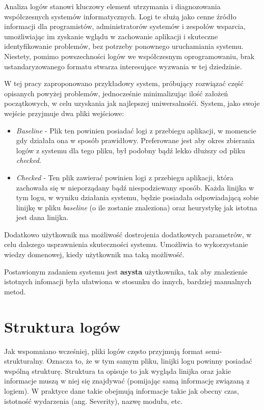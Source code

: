 Analiza logów stanowi kluczowy element utrzymania i diagnozowania współczesnych
systemów informatycznych. Logi te służą jako cenne źródło informacji dla
programistów, administratorów systemów i zespołów wsparcia, umożliwiając im
zyskanie wglądu w zachowanie aplikacji i skuteczne identyfikowanie problemów,
bez potrzeby ponownego uruchamiania systemu.
Niestety, pomimo powszechności logów we współczesnym oprogramowaniu, brak
ustandaryzowanego formatu stwarza interesujące wyzwania w tej dziedzinie.

W tej pracy zaproponowano przykładowy system, próbujący rozwiązać część
opisanych powyżej problemów, jednocześnie minimalizując ilość założeń
początkowych, w celu uzyskania jak najlepszej uniwersalnośći.
System, jako swoje wejście przyjmuje dwa pliki wejściowe:

\begin{itemize}
  \item \textit{Baseline} - Plik ten powinien posiadać logi z przebiegu aplikacji, w
    momencie gdy działała ona w sposób prawidłowy.
    Preferowane jest aby okres zbierania logów z systemu dla tego pliku, był
    podobny bądź lekko dłuższy od pliku \textit{checked}.
  \item \textit{Checked} - Ten plik zawierać powinien logi z przebiegu
    aplikacji, która zachowała się w nieporządany bądź niespodziewany sposób.
    Każda linijka w tym logu, w wyniku działania systemu, będzie posiadała
    odpowiadającą sobie linijkę w pliku \textit{baseline} (o ile zostanie
    znaleziona) oraz heurystykę jak istotna jest dana linijka.
\end{itemize}

Dodatkowo użytkownik ma możliwość dostrojenia dodatkowych parametrów, w celu
dalszego usprawnienia skuteczności systemu.
Umożliwia to wykorzystanie wiedzy domenowej, kiedy użytkownik ma taką możliwość.

Postawionym zadaniem systemu jest \textbf{asysta} użytkownika, tak aby
znalezienie istotnych infomacji była ułatwiona w stosunku do innych, bardziej
manualnych metod.


\section{Struktura logów}
\label{sec:log-structure}

Jak wspomniano wcześniej, pliki logów często przyjmują format semi-strukturalny.
Oznacza to, że w tym samym pliku, linijki logu powinny posiadać wspólną
strukturę.
Struktura ta opisuje to jak wygląda linijka oraz jakie informacje muszą w niej
się znajdywać (pomijając samą informację związaną z logiem).
W praktyce dane takie obejmują informacje takie jak obecny czas, istotność
wydarzenia (ang. Severity), nazwę modułu, etc.

